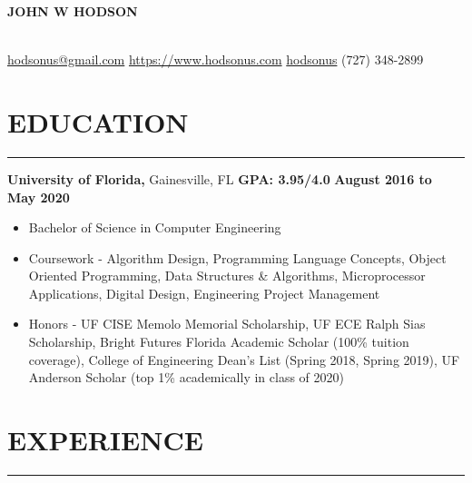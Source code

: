 \documentclass[11pt]{article} %
\begin{document}
	
	\noindent\centerline{ \huge\textbf{JOHN W HODSON}}\\
	
	\noindent \faEnvelopeSquare \space\href{mailto:hodsonus@gmail.com}{hodsonus@gmail.com} \hspace*{\fill} \faHome \space \href{https://www.hodsonus.com}{https://www.hodsonus.com} \hspace*{\fill} \faGithub \space \href{https://github.com/hodsonus}{hodsonus} \hspace*{\fill} \faMobilePhone \space (727) 348-2899\\
	
	\section*{EDUCATION}
		\hrule \relax
		\vspace{.4cm}
		
		\noindent \textbf{University of Florida,} Gainesville, FL
		\hfill\textbf{GPA: 3.95/4.0}
		\hfill\textbf{August 2016 to May 2020}
		
		\begin{itemize}[noitemsep,nolistsep, label = {-}]
			\item  Bachelor of Science in Computer Engineering
			\item  Coursework - Algorithm Design, Programming Language Concepts, Object Oriented Programming, Data Structures \& Algorithms, Microprocessor Applications, Digital Design, Engineering Project Management
			\item  Honors - UF CISE Memolo Memorial Scholarship, UF ECE Ralph Sias Scholarship, Bright Futures Florida Academic Scholar (100\% tuition coverage), College of Engineering Dean\rq s List (Spring 2018, Spring 2019), UF Anderson Scholar (top 1\% academically in class of 2020)
		\end{itemize}
		
		\vspace{.20cm}
	
	\section*{EXPERIENCE}
		\hrule \relax
		\vspace{.4cm}
		
\end{document}

